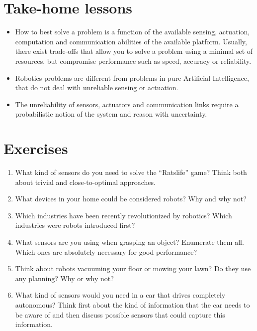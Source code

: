 \section*{Take-home lessons}
\begin{itemize}
\item How to best solve a problem is a function of the available sensing, actuation, computation and communication abilities of the available platform. Usually, there exist trade-offs that allow you to solve a problem using a minimal set of resources, but compromise performance such as speed, accuracy or reliability.
\item Robotics problems are different from problems in pure Artificial Intelligence, that do not deal with unreliable sensing or actuation.
\item The unreliability of sensors, actuators and communication links require a probabilistic notion of the system and reason with uncertainty.
\end{itemize}

\section*{Exercises}\small
\begin{enumerate}
\item What kind of sensors do you need to solve the ``Ratslife'' game? Think both about trivial and close-to-optimal approaches.
\item What devices in your home could be considered robots? Why and why not?
\item Which industries have been recently revolutionized by robotics? Which industries were robots introduced first?
\item What sensors are you using when grasping an object? Enumerate them all. Which ones are absolutely necessary for good performance?
\item Think about robots vacuuming your floor or mowing your lawn? Do they use any planning? Why or why not?
\item What kind of sensors would you need in a car that drives completely autonomous? Think first about the kind of information that the car needs to be aware of and then discuss possible sensors that could capture this information.
\end{enumerate}\normalsize

